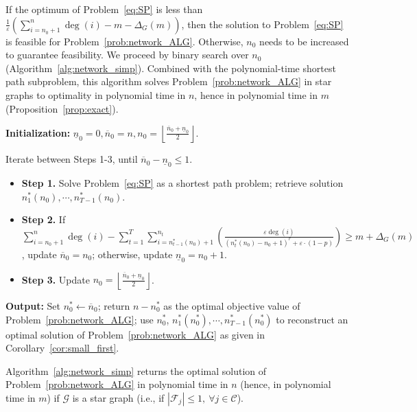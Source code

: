 \documentclass[nonblindrev]{informs3noheader}
\def\calC{\mathcal{C}}
\def\calF{\mathcal{F}}
\def\calG{\mathcal{G}}
\begin{document}
If the optimum of Problem~\eqref{eq:SP} is less than $\frac{1}{\varepsilon}\left(\sum_{i=n_0+1}^n \deg(i)-m-\Delta_G(m)\right)$, then the solution to Problem~\eqref{eq:SP} is feasible for Problem~\eqref{prob:network_ALG}. Otherwise, $n_0$ needs to be increased to guarantee feasibility. We proceed by binary search over $n_0$ (Algorithm~\ref{alg:network_simp}). Combined with the polynomial-time shortest path subproblem, this algorithm solves Problem~\eqref{prob:network_ALG} in star graphs to optimality in polynomial time in $n$, hence in polynomial time in $m$ (Proposition~\ref{prop:exact}).

\begin{algorithm} [h!]
\caption{Algorithm to solve Problem~\eqref{prob:network_ALG} in star graph $\calG$: \texttt{STAR}($\calG$).}\small
\label{alg:network_simp}
\begin{algorithmic}[1]
\item \textbf{Initialization:} $\underline{n}_0=0,\overline{n}_0=n, n_0=\left\lfloor\frac{\overline{n}_0+\underline{n}_0}{2}\right\rfloor$.
\item Iterate between Steps 1-3, until $\overline n_0-\underline n_0\leq 1$.
\begin{itemize}
    \item[] \textbf{Step 1.} Solve Problem~\eqref{eq:SP} as a shortest path problem; retrieve solution $n_1^*(n_0),\cdots, n_{T-1}^*(n_0)$.
    \item[] \textbf{Step 2.} If $\displaystyle\sum_{i=n_0+1}^n \deg(i)-\sum_{t=1}^T\sum_{i=n_{t-1}^*(n_0)+1}^{n_t}\left(\frac{\varepsilon \deg(i)}{\left(n_{t}^*(n_0)-n_0 +1\right)^r+\varepsilon\cdot(1-p)}\right)\geq m+\Delta_G(m)$, update $\overline{n}_0 = n_0$; otherwise, update $\underline{n}_0 = n_0+1$.
    \item[] \textbf{Step 3.} Update $n_0 = \left\lfloor\frac{\overline{n}_0 + \underline{n}_0}{2}\right\rfloor$.
\end{itemize}
\item \textbf{Output:} Set $n_0^*\gets\overline{n}_0$; return $n-n_0^*$ as the optimal objective value of Problem~\eqref{prob:network_ALG}; use $n_0^*$, $n_1^*(n_0^*),\cdots, n_{T-1}^*(n_0^*)$ to reconstruct an optimal solution of Problem~\eqref{prob:network_ALG} as given in Corollary~\ref{cor:small_first}.
\end{algorithmic}
\end{algorithm}

\begin{proposition}\label{prop:exact}
    Algorithm~\ref{alg:network_simp} returns the optimal solution of Problem~\eqref{prob:network_ALG} in polynomial time in $n$ (hence, in polynomial time in $m$) if $\calG$ is a star graph (i.e., if $|\calF_j|\leq1,\ \forall j\in\calC$).
\end{proposition}
\end{document}

